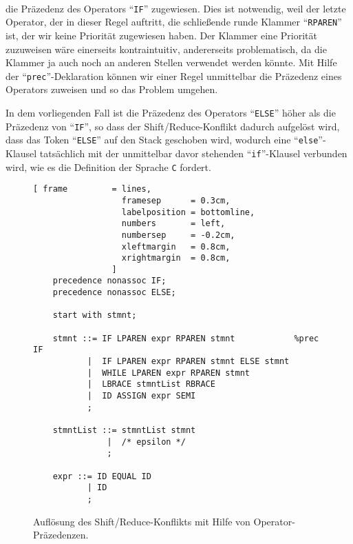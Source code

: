 \begin{enumerate}
\begin{enumerate}
            \\[0.2cm]
            die Pr\"azedenz des Operators ``\texttt{IF}'' zugewiesen.  Dies ist notwendig, weil 
            der letzte Operator, der in dieser Regel auftritt, die schlie{\ss}ende runde Klammer
            ``\texttt{RPAREN}'' ist, der wir keine Priorit\"at zugewiesen haben.  Der Klammer eine Priorit\"at
            zuzuweisen w\"are einerseits kontraintuitiv, andererseits problematisch, da die Klammer ja
            auch noch an anderen Stellen verwendet werden k\"onnte.  Mit Hilfe der
            ``\texttt{prec}''-Deklaration k\"onnen wir einer Regel unmittelbar die Pr\"azedenz
            eines Operators zuweisen und so das Problem umgehen.

            In dem vorliegenden Fall ist die Pr\"azedenz des Operators ``\texttt{ELSE}''
            h\"oher als die Pr\"azedenz von ``\texttt{IF}'', so dass der Shift/Reduce-Konflikt
            dadurch aufgel\"ost wird, dass das Token ``\texttt{ELSE}'' auf den Stack
            geschoben wird, wodurch eine ``\texttt{else}''-Klausel tats\"achlich mit der unmittelbar davor stehenden
            ``\texttt{if}''-Klausel verbunden wird, wie es die Definition der Sprache \texttt{C} fordert.
      \end{enumerate}


            \begin{figure}[!ht]
\centering
\begin{Verbatim}[ frame         = lines, 
                  framesep      = 0.3cm, 
                  labelposition = bottomline,
                  numbers       = left,
                  numbersep     = -0.2cm,
                  xleftmargin   = 0.8cm,
                  xrightmargin  = 0.8cm,
                ]
    precedence nonassoc IF;
    precedence nonassoc ELSE;

    start with stmnt;

    stmnt ::= IF LPAREN expr RPAREN stmnt            %prec IF
           |  IF LPAREN expr RPAREN stmnt ELSE stmnt
           |  WHILE LPAREN expr RPAREN stmnt
           |  LBRACE stmntList RBRACE
           |  ID ASSIGN expr SEMI
           ;
      
    stmntList ::= stmntList stmnt
               |  /* epsilon */
               ;
    
    expr ::= ID EQUAL ID
           | ID
           ;
\end{Verbatim}
\vspace*{-0.3cm}
\caption{Aufl\"osung des Shift/Reduce-Konflikts mit Hilfe von Operator-Pr\"azedenzen.}
\label{fig:dangling-else-precedence.cup}
\end{figure}


\end{enumerate}
